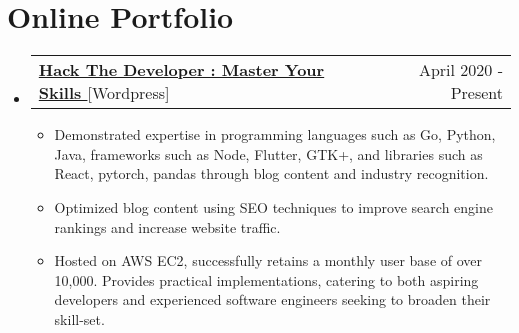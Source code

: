\documentclass[letterpaper,11pt]{article}
\makeatletter
\newcommand{\resumeItem}[1]{
  \item\small{
    {#1 \vspace{-2pt}}
  }
}
\newcommand{\resumeProjectHeading}[2]{
    \item
    \begin{tabular*}{0.97\textwidth}{l@{\extracolsep{\fill}}r}
      \small#1 & #2 \\
    \end{tabular*}\vspace{-7pt}
}
\newcommand{\resumeSubHeadingListStart}{\begin{itemize}[leftmargin=0.15in, label={}]}
\newcommand{\resumeSubHeadingListEnd}{\end{itemize}}
\newcommand{\resumeItemListStart}{\begin{itemize}}
\newcommand{\resumeItemListEnd}{\end{itemize}\vspace{-5pt}}
\makeatother
\begin{document}
    

\section{Online Portfolio}

\resumeSubHeadingListStart
      \resumeProjectHeading
          {\textbf{\href{https://hackthedeveloper.com} {Hack The Developer : Master Your Skills }}{[Wordpress]}}{ April 2020 - Present}
          \resumeItemListStart
           \resumeItem{Demonstrated expertise in programming languages such as Go, Python, Java, frameworks such as Node, Flutter, GTK+, and libraries such as React, pytorch, pandas through blog content and industry recognition.}
           \resumeItem{Optimized blog content using SEO techniques to improve search engine rankings and increase website traffic.}
           \resumeItem{Hosted on AWS EC2, successfully retains a monthly user base of over 10,000. Provides practical implementations, catering to both aspiring developers and experienced software engineers seeking to broaden their skill-set.}
          \resumeItemListEnd
    \resumeSubHeadingListEnd

\end{document}
